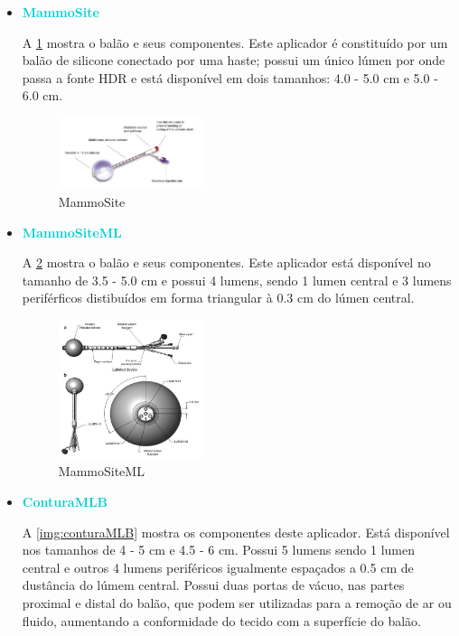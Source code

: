 \documentclass[11pt,a4paper]{article}
\begin{document}
			\begin{itemize}
				\item \textbf{\textcolor{DarkTurquoise}{MammoSite}}
				
					A    \ref{img:mammosite} mostra o balão e seus componentes. Este aplicador é constituído por um balão de silicone conectado por uma haste; possui um único lúmen por onde passa a fonte HDR e está disponível em dois tamanhos: 4.0 - 5.0 cm e 5.0 - 6.0 cm.

					\begin{figure}[h]
						\centering
						\includegraphics[width=0.4\textwidth]{Imagens/balaoMammoSite.JPG}
						\caption{MammoSite}
						\label{img:mammosite}
					\end{figure}

				\item \textbf{\textcolor{DarkTurquoise}{MammoSiteML}}
				
					A    \ref{img:mammositeml} mostra o balão e seus componentes. Este aplicador está disponível no tamanho de 3.5 - 5.0 cm e possui 4 lumens, sendo 1 lumen central e 3 lumens periférficos distibuídos em forma triangular à 0.3 cm do lúmen central.

					\begin{figure}[h]
						\centering
						\includegraphics[width=0.4\textwidth]{Imagens/mammositeML.JPG}
						\caption{MammoSiteML}
						\label{img:mammositeml}
					\end{figure}

				
				\item \textbf{\textcolor{DarkTurquoise}{ConturaMLB}}
					
					A    \ref{img:conturaMLB} mostra os componentes deste aplicador. Está disponível nos tamanhos de 4 - 5 cm e 4.5 - 6 cm. Possui 5 lumens sendo 1 lumen central e outros 4 lumens periféricos igualmente espaçados a 0.5 cm de dustância do lúmem central. Possui duas portas de vácuo, nas partes proximal e distal do balão, que podem ser utilizadas para a remoção de ar ou fluido, aumentando a conformidade do tecido com a superfície do balão.
					

\end{itemize}
\end{document}
